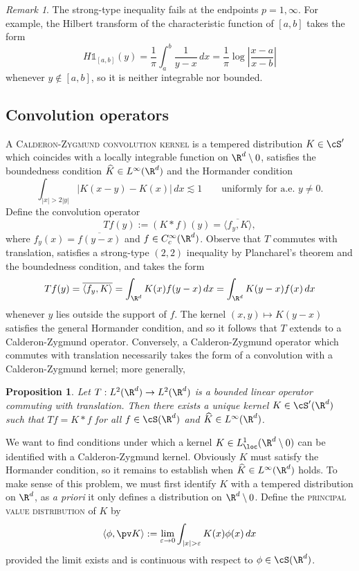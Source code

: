 \documentclass[reqno]{amsart}
\newtheorem{proposition}[theorem]{Proposition}
\theoremstyle{definition}
\theoremstyle{remark}
\newtheorem*{remark}{Remark}
\newcounter{problem}[section]	\declaretheorem[style=thmrecbox,name=Problem, numberlike=problem]{statement}
\renewcommand{\epsilon}{\varepsilon}
\renewcommand{\emph}{\textsc}
\begin{document}
\begin{remark}
	The strong-type inequality fails at the endpoints $p = 1, \infty$. For example, the Hilbert transform of the characteristic function of $[a, b]$ takes the form
		\[ H \mathbb 1_{[a, b]} (y) = \frac1\pi \int_a^b \frac{1}{y - x} \, dx = \frac1\pi \log \left| \frac{x - a}{x - b} \right| \]
	whenever $y \not\in [a, b]$, so it is neither integrable nor bounded. 
\end{remark}

\subsection{Convolution operators}
\label{sec:convop}
A \emph{Calderon-Zygmund convolution kernel} is a tempered distribution $K \in \cS'$ which coincides with a locally integrable function on $\R^d \setminus 0$, satisfies the boundedness condition $\widehat K \in L^\infty (\R^d)$ and the Hormander condition 
	\[ \int_{|x| > 2|y|} |K(x - y) - K(x)| \, dx \lesssim 1 \qquad \text{uniformly for a.e. } y \neq 0. \]
Define the convolution operator
	\[ Tf (y) := (K * f) (y) = \overline{\langle f_y, K \rangle}, \]
where $f_y (x) = \overline{f(y - x)}$ and $f \in C^\infty_c (\R^d)$. Observe that $T$ commutes with translation, satisfies a strong-type $(2, 2)$ inequality by Plancharel's theorem and the boundedness condition, and takes the form 
	\[ Tf(y) = \overline{\langle f_y, K \rangle} =  \int_{\R^d} K(x) f(y - x) \, dx = \int_{\R^d} K(y - x) f(x) \, dx \]	
whenever $y$ lies outside the support of $f$. The kernel $(x, y) \mapsto K(y - x)$ satisfies the general Hormander condition, and so it follows that $T$ extends to a Calderon-Zygmund operator. Conversely, a Calderon-Zygmund operator which commutes with translation necessarily takes the form of a convolution with a Calderon-Zygmund kernel; more generally, 

\begin{proposition}
	Let $T: L^2 (\R^d) \to L^2 (\R^d)$ is a bounded linear operator commuting with translation. Then there exists a unique kernel $K \in \cS' (\R^d)$ such that $Tf = K * f$ for all $f \in \cS (\R^d)$ and $\widehat K \in L^\infty (\R^d)$. 
\end{proposition}

We want to find conditions under which a kernel $K \in L^1_{\loc} (\R^d \setminus 0)$ can be identified with a Calderon-Zygmund kernel. Obviously $K$ must satisfy the Hormander condition, so it remains to establish when $\widehat K \in L^\infty (\R^d)$ holds. To make sense of this problem, we must first identify $K$ with a tempered distribution on $\R^d$, as \textit{a priori} it only defines a distribution on $\R^d \setminus 0$. Define the \emph{principal value distribution} of $K$ by
	\[ \langle \phi,  \pv K \rangle := \lim_{\epsilon \to 0} \int_{|x| > \epsilon} K(x) \phi(x) \, dx \]
provided the limit exists and is continuous with respect to $\phi \in \cS (\R^d)$.
\end{document}
